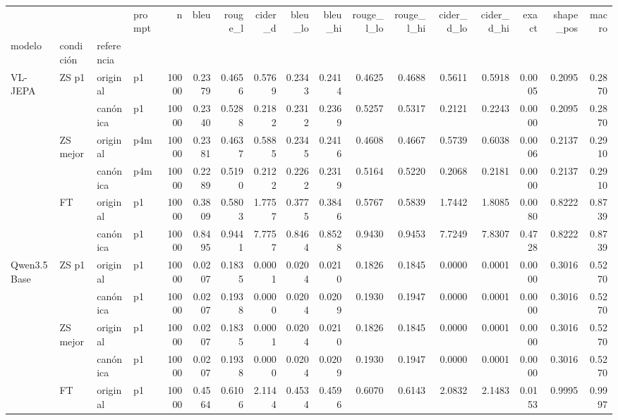 \begin{tabular}{llllrrrrrrrrrrrrr}
\toprule
 &  &  & prompt & n & bleu & rouge\_l & cider\_d & bleu\_lo & bleu\_hi & rouge\_l\_lo & rouge\_l\_hi & cider\_d\_lo & cider\_d\_hi & exact & shape\_pos & macro \\
modelo & condición & referencia &  &  &  &  &  &  &  &  &  &  &  &  &  &  \\
\midrule
\multirow[t]{6}{*}{VL-JEPA} & \multirow[t]{2}{*}{ZS p1} & original & p1 & 10000 & 0.2379 & 0.4656 & 0.5769 & 0.2343 & 0.2414 & 0.4625 & 0.4688 & 0.5611 & 0.5918 & 0.0005 & 0.2095 & 0.2870 \\
 &  & canónica & p1 & 10000 & 0.2340 & 0.5288 & 0.2182 & 0.2312 & 0.2369 & 0.5257 & 0.5317 & 0.2121 & 0.2243 & 0.0000 & 0.2095 & 0.2870 \\
\cline{2-17}
 & \multirow[t]{2}{*}{ZS mejor} & original & p4m & 10000 & 0.2381 & 0.4637 & 0.5885 & 0.2345 & 0.2416 & 0.4608 & 0.4667 & 0.5739 & 0.6038 & 0.0006 & 0.2137 & 0.2910 \\
 &  & canónica & p4m & 10000 & 0.2289 & 0.5190 & 0.2122 & 0.2262 & 0.2319 & 0.5164 & 0.5220 & 0.2068 & 0.2181 & 0.0000 & 0.2137 & 0.2910 \\
\cline{2-17}
 & \multirow[t]{2}{*}{FT} & original & p1 & 10000 & 0.3809 & 0.5803 & 1.7757 & 0.3775 & 0.3846 & 0.5767 & 0.5839 & 1.7442 & 1.8085 & 0.0080 & 0.8222 & 0.8739 \\
 &  & canónica & p1 & 10000 & 0.8495 & 0.9441 & 7.7757 & 0.8464 & 0.8528 & 0.9430 & 0.9453 & 7.7249 & 7.8307 & 0.4728 & 0.8222 & 0.8739 \\
\cline{1-17} \cline{2-17}
\multirow[t]{6}{*}{Qwen3.5 Base} & \multirow[t]{2}{*}{ZS p1} & original & p1 & 10000 & 0.0207 & 0.1835 & 0.0001 & 0.0204 & 0.0210 & 0.1826 & 0.1845 & 0.0000 & 0.0001 & 0.0000 & 0.3016 & 0.5270 \\
 &  & canónica & p1 & 10000 & 0.0207 & 0.1938 & 0.0000 & 0.0204 & 0.0209 & 0.1930 & 0.1947 & 0.0000 & 0.0001 & 0.0000 & 0.3016 & 0.5270 \\
\cline{2-17}
 & \multirow[t]{2}{*}{ZS mejor} & original & p1 & 10000 & 0.0207 & 0.1835 & 0.0001 & 0.0204 & 0.0210 & 0.1826 & 0.1845 & 0.0000 & 0.0001 & 0.0000 & 0.3016 & 0.5270 \\
 &  & canónica & p1 & 10000 & 0.0207 & 0.1938 & 0.0000 & 0.0204 & 0.0209 & 0.1930 & 0.1947 & 0.0000 & 0.0001 & 0.0000 & 0.3016 & 0.5270 \\
\cline{2-17}
 & \multirow[t]{2}{*}{FT} & original & p1 & 10000 & 0.4564 & 0.6106 & 2.1144 & 0.4534 & 0.4596 & 0.6070 & 0.6143 & 2.0832 & 2.1483 & 0.0153 & 0.9995 & 0.9997 \\

\end{tabular}
